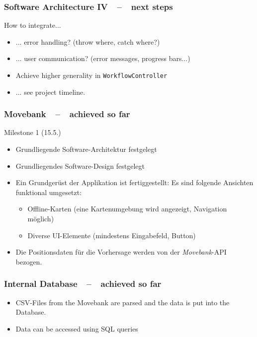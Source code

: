 \documentclass[xcolor=dvipsnames]{beamer}
\begin{document}
\begin{frame}
	\frametitle{\textbf{Software Architecture IV}~~--~~next steps}
	How to integrate...
	\begin{itemize}
		\item ... error handling? (throw where, catch where?)
		\item ... user communication? (error messages, progress bars...)
	\end{itemize}
	\lstset{style=normalstyle}
	\begin{itemize}
		\item Achieve higher generality in \lstinline$WorkflowController$
	\end{itemize}
	\begin{itemize}
	 	 \item ... see project timeline.
	\end{itemize}
\end{frame}




\begin{frame}
	\frametitle{\textbf{Movebank}~~--~~achieved so far}
	\Large{Milestone 1 (15.5.)}
	\normalsize
	\begin{itemize} 
		\item \color{LightGray}Grundliegende Software-Architektur festgelegt
		\item \color{LightGray}Grundliegendes Software-Design festgelegt
		\item \color{LightGray}Ein Grundgerüst der Applikation ist fertiggestellt: Es sind folgende Ansichten funktional umgesetzt:
		\begin{itemize} 
			\item \color{LightGray}Offline-Karten (eine Kartenumgebung wird angezeigt, Navigation möglich)
			\item \color{LightGray}Diverse UI-Elemente (mindestens Eingabefeld, Button)
		\end{itemize} 
		\item \color{Green}Die Positionsdaten für die Vorhersage werden von der \textit{Movebank}-API bezogen.
	\end{itemize}     
\end{frame}




\begin{frame}
	\frametitle{\textbf{Internal Database}~~--~~achieved so far}
    
	\begin{itemize}
		\item CSV-Files from the Movebank are parsed and the data is put into the Database.
		\item Data can be accessed using SQL queries
	\end{itemize}
    
\end{frame}
\end{document}
